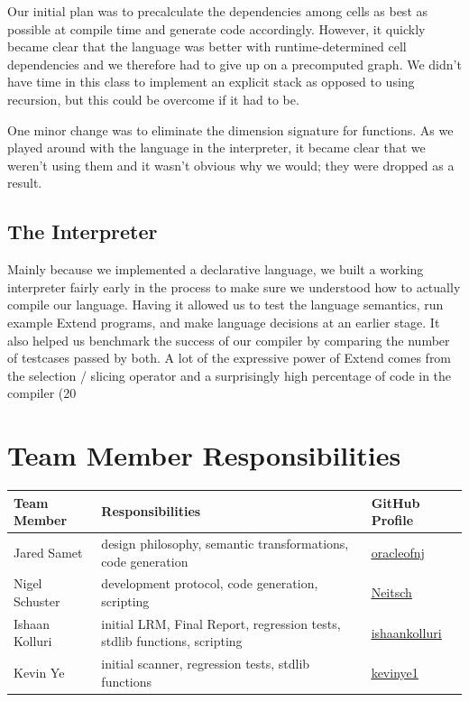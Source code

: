 Our initial plan was to precalculate the dependencies among cells as best as possible at compile time and generate code accordingly. However, it quickly became clear that the language was better with runtime-determined cell dependencies and we therefore had to give up on a precomputed graph. We didn't have time in this class to implement an explicit stack as opposed to using recursion, but this could be overcome if it had to be.

One minor change was to eliminate the dimension signature for functions. As we played around with the language in the interpreter, it became clear that we weren't using them and it wasn't obvious why we would; they were dropped as a result.


  \subsection{The Interpreter}
  Mainly because we implemented a declarative language, we built a working interpreter fairly early in the process to make sure we understood how to actually compile our language. Having it allowed us to test the language semantics, run example Extend programs, and make language decisions at an earlier stage. It also helped us benchmark the success of our compiler by comparing the number of testcases passed by both. A lot of the expressive power of Extend comes from the selection / slicing operator and a surprisingly high percentage of code in the compiler (20%

\section{Team Member Responsibilities}

\begin{tabular}{ | l | l | l |}\hline
  Team Member  & Responsibilities      & GitHub Profile\\ \hline
  Jared Samet & design philosophy, semantic transformations, code generation  & \underline{\href{https://github.com/oracleofnj}{oracleofnj}}\\
  Nigel Schuster & development protocol, code generation, scripting  & \underline{\href{https://github.com/Neitsch}{Neitsch}}\\
  Ishaan Kolluri & initial LRM, Final Report, regression tests, stdlib functions, scripting & \underline{\href{https://github.com/ishaankolluri}{ishaankolluri}}\\
  Kevin Ye & initial scanner, regression tests, stdlib functions & \underline{\href{https://github.com/kevinye1}{kevinye1}}\\ \hline
\end{tabular}
